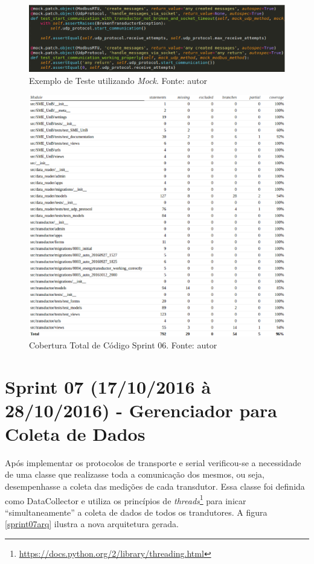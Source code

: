 \begin{figure}[!htpb]
    \centering
    \includegraphics[keepaspectratio=true,scale=0.5]{figuras/exemplo_mock.eps}
    \caption{Exemplo de Teste utilizando \textit{Mock}. Fonte: autor}
    \label{exemplo_mock}
\end{figure}

\begin{figure}[!htpb]
    \centering
    \includegraphics[keepaspectratio=true,scale=0.5]{figuras/cobertura03.eps}
    \caption{Cobertura Total de Código Sprint 06. Fonte: autor}
    \label{cobertura03}
\end{figure}

\section{Sprint 07 (17/10/2016 à 28/10/2016) - Gerenciador para Coleta de Dados}
Após implementar os protocolos de transporte e serial verificou-se a necessidade de uma classe que realizasse toda a comunicação dos mesmos, ou seja, desempenhasse a coleta das medições de cada transdutor. Essa classe foi definida como DataCollector e utiliza os princípios de \textit{threads}\footnote{\url{https://docs.python.org/2/library/threading.html}} para inicar ``simultaneamente'' a coleta de dados de todos os trandutores. A figura \ref{sprint07arq} ilustra a nova arquitetura gerada.

